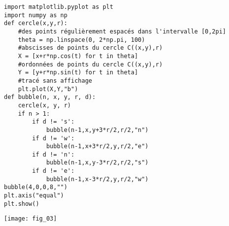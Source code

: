 \noindent\begin{minipage}[c]{.49\linewidth}
\begin{lstlisting}
import matplotlib.pyplot as plt
import numpy as np
def cercle(x,y,r):
    #des points régulièrement espacés dans l'intervalle [0,2pi]
    theta = np.linspace(0, 2*np.pi, 100) 
    #abscisses de points du cercle C((x,y),r)
    X = [x+r*np.cos(t) for t in theta] 
    #ordonnées de points du cercle C((x,y),r)
    Y = [y+r*np.sin(t) for t in theta] 
    #tracé sans affichage
    plt.plot(X,Y,"b") 
def bubble(n, x, y, r, d):
    cercle(x, y, r)
    if n > 1:
        if d != 's':
            bubble(n-1,x,y+3*r/2,r/2,"n")
        if d != 'w':
            bubble(n-1,x+3*r/2,y,r/2,"e")
        if d != 'n':
            bubble(n-1,x,y-3*r/2,r/2,"s")
        if d != 'e':
            bubble(n-1,x-3*r/2,y,r/2,"w")
bubble(4,0,0,8,"")
plt.axis("equal")
plt.show()
\end{lstlisting}
\end{minipage} \hfill
\begin{minipage}[c]{.49\linewidth}
\begin{center}
\texttt{[image: fig\_03]}
\end{center}
\end{minipage}
%
%



